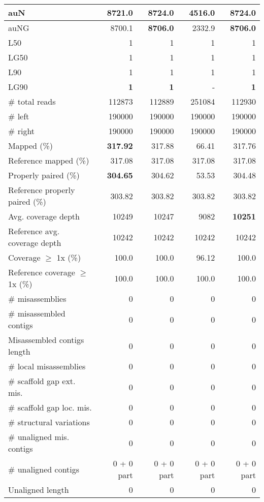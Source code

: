 \documentclass[12pt,a4paper]{article}
\begin{document}
\begin{table}[ht]
\begin{center}
\begin{tabular}{|l*{4}{|r}|}
auN & 8721.0 & {\bf 8724.0} & 4516.0 & {\bf 8724.0} \\ \hline
auNG & 8700.1 & {\bf 8706.0} & 2332.9 & {\bf 8706.0} \\ \hline
L50 & 1 & 1 & 1 & 1 \\ \hline
LG50 & 1 & 1 & 1 & 1 \\ \hline
L90 & 1 & 1 & 1 & 1 \\ \hline
LG90 & {\bf 1} & {\bf 1} & - & {\bf 1} \\ \hline
\# total reads & 112873 & 112889 & 251084 & 112930 \\ \hline
\# left & 190000 & 190000 & 190000 & 190000 \\ \hline
\# right & 190000 & 190000 & 190000 & 190000 \\ \hline
Mapped (\%) & {\bf 317.92} & 317.88 & 66.41 & 317.76 \\ \hline
Reference mapped (\%) & 317.08 & 317.08 & 317.08 & 317.08 \\ \hline
Properly paired (\%) & {\bf 304.65} & 304.62 & 53.53 & 304.48 \\ \hline
Reference properly paired (\%) & 303.82 & 303.82 & 303.82 & 303.82 \\ \hline
Avg. coverage depth & 10249 & 10247 & 9082 & {\bf 10251} \\ \hline
Reference avg. coverage depth & 10242 & 10242 & 10242 & 10242 \\ \hline
Coverage $\geq$ 1x (\%) & 100.0 & 100.0 & 96.12 & 100.0 \\ \hline
Reference coverage $\geq$ 1x (\%) & 100.0 & 100.0 & 100.0 & 100.0 \\ \hline
\# misassemblies & 0 & 0 & 0 & 0 \\ \hline
\# misassembled contigs & 0 & 0 & 0 & 0 \\ \hline
Misassembled contigs length & 0 & 0 & 0 & 0 \\ \hline
\# local misassemblies & 0 & 0 & 0 & 0 \\ \hline
\# scaffold gap ext. mis. & 0 & 0 & 0 & 0 \\ \hline
\# scaffold gap loc. mis. & 0 & 0 & 0 & 0 \\ \hline
\# structural variations & 0 & 0 & 0 & 0 \\ \hline
\# unaligned mis. contigs & 0 & 0 & 0 & 0 \\ \hline
\# unaligned contigs & 0 + 0 part & 0 + 0 part & 0 + 0 part & 0 + 0 part \\ \hline
Unaligned length & 0 & 0 & 0 & 0 \\ \hline

\end{tabular}
\end{center}
\end{table}
\end{document}
